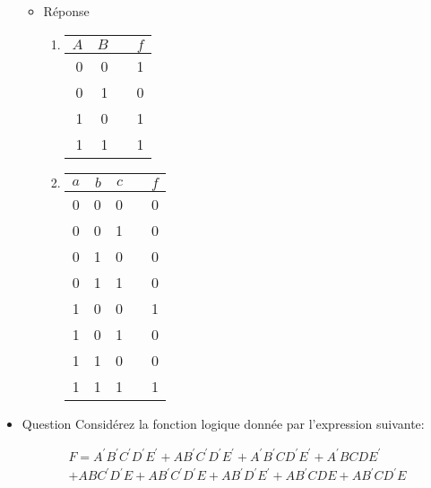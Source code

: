 \documentclass[letter, oneside]{book}
\begin{document}
\begin{itemize}
\begin{itemize}
\item Réponse
\label{sec:org0dc0c99}
\begin{enumerate}
\item \begin{center}
\begin{tabular}{rrlr}
\(A\) & \(B\) &  & \(f\)\\[0pt]
\hline
0 & 0 &  & 1\\[0pt]
0 & 1 &  & 0\\[0pt]
1 & 0 &  & 1\\[0pt]
1 & 1 &  & 1\\[0pt]
\end{tabular}
\end{center}

\item \begin{center}
\begin{tabular}{rrrlr}
\(a\) & \(b\) & \(c\) &  & \(f\)\\[0pt]
\hline
0 & 0 & 0 &  & 0\\[0pt]
0 & 0 & 1 &  & 0\\[0pt]
0 & 1 & 0 &  & 0\\[0pt]
0 & 1 & 1 &  & 0\\[0pt]
1 & 0 & 0 &  & 1\\[0pt]
1 & 0 & 1 &  & 0\\[0pt]
1 & 1 & 0 &  & 0\\[0pt]
1 & 1 & 1 &  & 1\\[0pt]
\end{tabular}
\end{center}
\end{enumerate}
\end{itemize}

\item Question
\label{sec:org15b9aa1}
Considérez la fonction logique donnée par l'expression suivante:

\begin{multline*}
F = A^{\prime} B^{\prime} C^{\prime} D^{\prime} E^{\prime} + {A} B^{\prime} C^{\prime} D^{\prime} E^{\prime} + A^{\prime} B^{\prime} {C} D^{\prime} E^{\prime} + A^{\prime} {B} {C} {D} E^{\prime} \\ 
+ {A} {B} C^{\prime} D^{\prime} {E} + {A} B^{\prime} C^{\prime} D^{\prime} {E} + {A} B^{\prime} D^{\prime} E^{\prime} + {A} B^{\prime} {C} {D} {E} + {A} B^{\prime}  {C} D^{\prime} {E}
\end{multline*}


\end{itemize}
\end{document}
